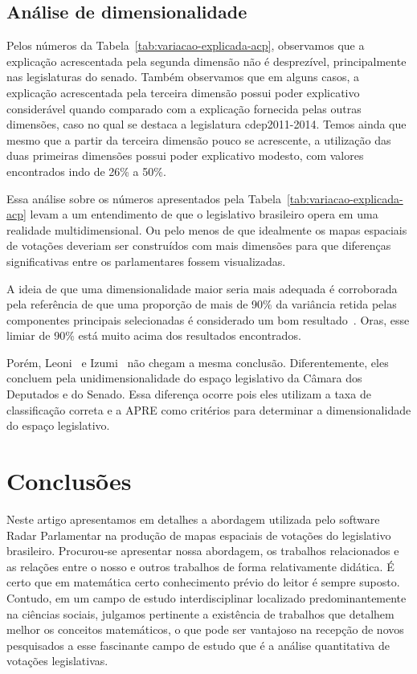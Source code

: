 \documentclass[a4paper, 12pt]{article}
\begin{document}
\subsection{Análise de dimensionalidade}

Pelos números da Tabela~\ref{tab:variacao-explicada-acp}, observamos que a explicação acrescentada pela segunda dimensão não é desprezível, principalmente nas legislaturas do senado. Também observamos que em alguns casos, a explicação acrescentada pela terceira dimensão possui poder explicativo considerável quando comparado com a explicação fornecida pelas outras dimensões, caso no qual se destaca a legislatura cdep2011-2014. Temos ainda que mesmo que a partir da terceira dimensão pouco se acrescente, a utilização das duas primeiras dimensões possui poder explicativo modesto, com valores encontrados indo de 26\% a 50\%. 

Essa análise sobre os números apresentados pela Tabela~\ref{tab:variacao-explicada-acp} levam a um entendimento de que o legislativo brasileiro opera em uma realidade multidimensional. Ou pelo menos de que idealmente os mapas espaciais de votações deveriam ser construídos com mais dimensões para que diferenças significativas entre os parlamentares fossem visualizadas. 

A ideia de que uma dimensionalidade maior seria mais adequada é corroborada pela referência de que uma proporção de mais de 90\% da variância retida pelas componentes principais selecionadas é considerado um bom resultado~\cite{DataMining2003}. Oras, esse limiar de 90\% está muito acima dos resultados encontrados.

Porém, Leoni~\cite{leoni02cdep} e Izumi~\cite{izumi2016senado} não chegam a mesma conclusão. Diferentemente, eles concluem pela unidimensionalidade do espaço legislativo da Câmara dos Deputados e do Senado. Essa diferença ocorre pois eles utilizam a taxa de classificação correta e a APRE como critérios para determinar a dimensionalidade do espaço legislativo.

\section{Conclusões}
\label{sec:conclusoes}

Neste artigo apresentamos em detalhes a abordagem utilizada pelo software Radar Parlamentar na produção de mapas espaciais de votações do legislativo brasileiro. Procurou-se apresentar nossa abordagem, os trabalhos relacionados e as relações entre o nosso e outros trabalhos de forma relativamente didática. É certo que em matemática certo conhecimento prévio do leitor é sempre suposto. Contudo, em um campo de estudo interdisciplinar localizado predominantemente na ciências sociais, julgamos pertinente a existência de trabalhos que detalhem melhor os conceitos matemáticos, o que pode ser vantajoso na recepção de novos pesquisados a esse fascinante campo de estudo que é a análise quantitativa de votações legislativas.
\end{document}
